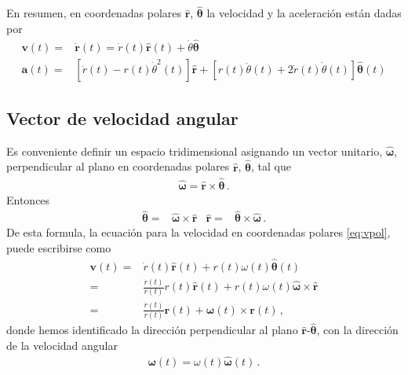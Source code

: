 \begin{frame}
  En resumen, en coordenadas polares $\hat{\mathbf{r}}$, $\hat{\boldsymbol{\theta}}$ la velocidad y la aceleración están dadas por
\begin{align*}
   \mathbf{v}(t)=&\dot{\mathbf{r}}(t)=\dot{r}(t)\hat{\mathbf{r}}(t)+
\dot{\theta}\hat{\boldsymbol{\theta}}\nonumber\\
 \mathbf{a}(t)=&
\left[\ddot{r}(t)-r(t)\dot{\theta}^2(t)\right]\hat{\mathbf{r}} 
+\left[r(t)\ddot{\theta}(t)+2\dot{r}(t)\dot{\theta}(t)  \right]\hat{\boldsymbol{\theta}}(t)
\end{align*}
\end{frame}

\subsection{Vector de velocidad angular}

Es conveniente definir un espacio tridimensional asignando un vector unitario,
$\hat{\boldsymbol{\omega}}$, perpendicular al plano en coordenadas polares
$\hat{\mathbf{r}}$, $\hat{\boldsymbol{\theta}}$, tal que
\begin{align*}
  \hat{\boldsymbol{\omega}}=\hat{\mathbf{r}}\times \hat{\boldsymbol{\theta}}\,.
\end{align*}
Entonces
\begin{align*}
 \hat{\boldsymbol{\theta}}=&\hat{\boldsymbol{\omega}}\times\hat{\mathbf{r}}& \hat{\mathbf{r}}=&\hat{\boldsymbol{\theta}}\times\hat{\boldsymbol{\omega}}\,.
\end{align*}
De esta formula, la ecuación para la velocidad en coordenadas polares \eqref{eq:vpol}, puede escribirse como
\begin{align}
    \mathbf{v}(t)
  =&\dot{r}(t)\hat{\mathbf{r}}(t)+r(t)\omega(t)\hat{\boldsymbol{\theta}}(t)\nonumber\\
  =&\frac{\dot{r}(t)}{r(t)}r(t)\hat{\mathbf{r}}(t)+r(t)\omega(t)\hat{\boldsymbol{\omega}}\times\hat{\mathbf{r}}\nonumber\\
  =&\frac{\dot{r}(t)}{r(t)}\mathbf{r}(t)+\boldsymbol{\omega}(t)\times\mathbf{r}(t)\,,
\end{align}
donde hemos identificado la dirección perpendicular al plano $\hat{\mathbf{r}}$-$\hat{\boldsymbol{\theta}}$, con la dirección de la velocidad angular
\begin{align}
  \boldsymbol{\omega}(t)=\omega(t)\hat{\boldsymbol{\omega}}(t)\,.
\end{align}





